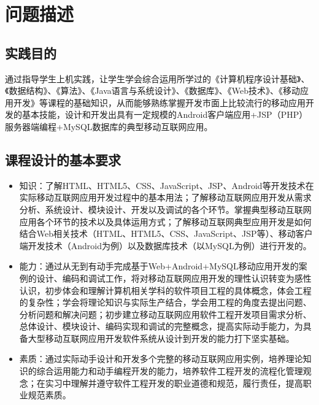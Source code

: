 \documentclass[UTF8,12pt]{article}
\begin{document}
\begin{titlepage}
    
\end{titlepage}

\begin{center}
    \tableofcontents
\end{center}
\newpage

\section{问题描述}
\subsection{实践目的}
通过指导学生上机实践，让学生学会综合运用所学过的《计算机程序设计基础》、《数据结构》、《算法》、《Java语言与系统设计》、《数据库》、《Web技术》、《移动应用开发》等课程的基础知识，从而能够熟练掌握开发市面上比较流行的移动应用开发的基本技能，设计和开发出具有一定规模的Android客户端应用+JSP（PHP）服务器端编程+MySQL数据库的典型移动互联网应用。

\subsection{课程设计的基本要求}
\begin{itemize}
    \item 知识：了解HTML、HTML5、CSS、JavaScript、JSP、Android等开发技术在实际移动互联网应用开发过程中的基本用法；了解移动互联网应用开发从需求分析、系统设计、模块设计、开发以及调试的各个环节。掌握典型移动互联网应用各个环节的技术以及具体运用方式；了解移动互联网典型应用开发是如何结合Web相关技术（HTML、HTML5、CSS、JavaScript、JSP等）、移动客户端开发技术（Android为例）以及数据库技术（以MySQL为例）进行开发的。
    \item 能力：通过从无到有动手完成基于Web+Android+MySQL移动应用开发的案例的设计、编码和调试工作，将对移动互联网应用开发的理性认识转变为感性认识，初步体会和理解计算机相关学科的软件项目工程的具体概念，体会工程的复杂性；学会将理论知识与实际生产结合，学会用工程的角度去提出问题、分析问题和解决问题；初步建立移动互联网应用软件工程开发项目需求分析、总体设计、模块设计、编码实现和调试的完整概念，提高实际动手能力，为具备大型移动互联网应用开发软件系统从设计到开发的能力打下坚实基础。
    \item 素质：通过实际动手设计和开发多个完整的移动互联网应用实例，培养理论知识的综合运用能力和动手编程开发的能力，培养软件工程开发的流程化管理观念；在实习中理解并遵守软件工程开发的职业道德和规范，履行责任，提高职业规范素质。
\end{itemize}
\end{document}
